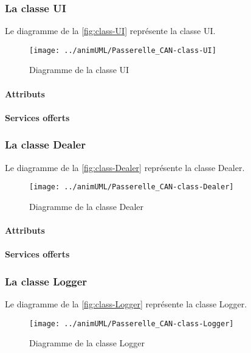 \subsubsection{La classe UI}

Le diagramme de la \autoref{fig:class-UI} représente la classe UI.
\begin{figure}[H]
	\centering
	\texttt{[image: ../animUML/Passerelle\_CAN-class-UI]}
	\caption{Diagramme de la classe UI}
	\label{fig:class-UI}
\end{figure}


\paragraph{Attributs}
\classUIProperties
\paragraph{Services offerts}
\classUIOperations
\subsubsection{La classe Dealer}

Le diagramme de la \autoref{fig:class-Dealer} représente la classe Dealer.
\begin{figure}[H]
	\centering
	\texttt{[image: ../animUML/Passerelle\_CAN-class-Dealer]}
	\caption{Diagramme de la classe Dealer}
	\label{fig:class-Dealer}
\end{figure}


\paragraph{Attributs}
\classDealerProperties
\paragraph{Services offerts}
\classDealerOperations
\subsubsection{La classe Logger}

Le diagramme de la \autoref{fig:class-Logger} représente la classe Logger.
\begin{figure}[H]
	\centering
	\texttt{[image: ../animUML/Passerelle\_CAN-class-Logger]}
	\caption{Diagramme de la classe Logger}
	\label{fig:class-Logger}
\end{figure}


